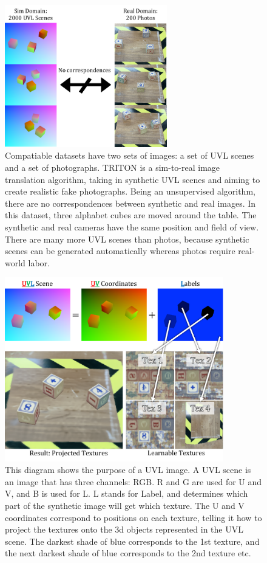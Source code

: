 \documentclass{article}
\begin{document}
\begin{figure}[H]
	\begin{center}
		\includegraphics[width=200pt]{../images/dataset_explanation.pdf}
	\end{center}
	\caption{
		Compatiable datasets have two sets of images: a set of UVL scenes and a set of photographs.
		TRITON is a sim-to-real image translation algorithm, taking in synthetic UVL scenes and aiming to create realistic fake photographs. 
		Being an unsupervised algorithm, there are no correspondences between synthetic and real images.
		In this dataset, three alphabet cubes are moved around the table. 
		The synthetic and real cameras have the same position and field of view.
		There are many more UVL scenes than photos, because synthetic scenes can be generated automatically whereas photos require real-world labor.
		}
	\label{fig:dataset_explanation}
\end{figure}


\begin{figure}[H]
	\begin{center}
		\includegraphics[width=270pt]{../images/uvl_explanation.pdf}
	\end{center}
	\caption{
		This diagram shows the purpose of a UVL image.
		 A UVL scene is an image that has three channels: RGB.
		 R and G are used for U and V, and B is used for L.
		 L stands for Label, and determines which part of the synthetic image will get which texture.
		 The U and V coordinates correspond to positions on each texture,
		 	telling it how to project the textures onto the 3d objects represented in the UVL scene.
		The darkest shade of blue corresponds to the 1st texture, and the next darkest shade of blue corresponds to the 2nd texture etc.
		}
	\label{fig:uvl_explanation}
\end{figure}
\end{document}
